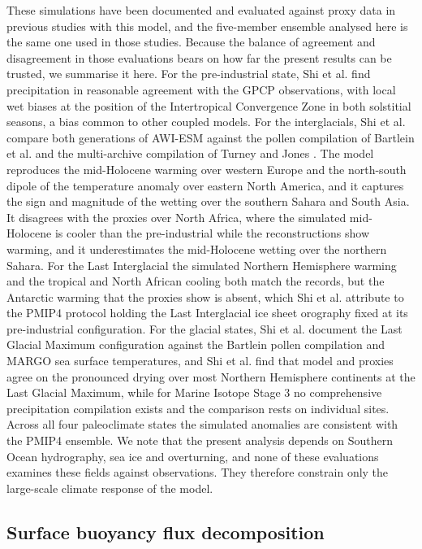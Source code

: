 \documentclass[pdflatex,sn-nature]{sn-jnl}
\begin{document}
These simulations have been documented and evaluated against proxy data in previous studies with this model, and the five-member ensemble analysed here is the same one used in those studies. Because the balance of agreement and disagreement in those evaluations bears on how far the present results can be trusted, we summarise it here. For the pre-industrial state, Shi et al. \cite{Shi2025GRL} find precipitation in reasonable agreement with the GPCP observations, with local wet biases at the position of the Intertropical Convergence Zone in both solstitial seasons, a bias common to other coupled models. For the interglacials, Shi et al. \cite{Shi2022JCLI} compare both generations of AWI-ESM against the pollen compilation of Bartlein et al. \cite{Bartlein2011} and the multi-archive compilation of Turney and Jones \cite{TurneyJones2010}. The model reproduces the mid-Holocene warming over western Europe and the north-south dipole of the temperature anomaly over eastern North America, and it captures the sign and magnitude of the wetting over the southern Sahara and South Asia. It disagrees with the proxies over North Africa, where the simulated mid-Holocene is cooler than the pre-industrial while the reconstructions show warming, and it underestimates the mid-Holocene wetting over the northern Sahara. For the Last Interglacial the simulated Northern Hemisphere warming and the tropical and North African cooling both match the records, but the Antarctic warming that the proxies show is absent, which Shi et al. \cite{Shi2022JCLI} attribute to the PMIP4 protocol holding the Last Interglacial ice sheet orography fixed at its pre-industrial configuration. For the glacial states, Shi et al. \cite{Shi2023CP} document the Last Glacial Maximum configuration against the Bartlein pollen compilation and MARGO sea surface temperatures, and Shi et al. \cite{Shi2025GRL} find that model and proxies agree on the pronounced drying over most Northern Hemisphere continents at the Last Glacial Maximum, while for Marine Isotope Stage 3 no comprehensive precipitation compilation exists and the comparison rests on individual sites. Across all four paleoclimate states the simulated anomalies are consistent with the PMIP4 ensemble. We note that the present analysis depends on Southern Ocean hydrography, sea ice and overturning, and none of these evaluations examines these fields against observations. They therefore constrain only the large-scale climate response of the model.


\subsection{Surface buoyancy flux decomposition}
\end{document}

